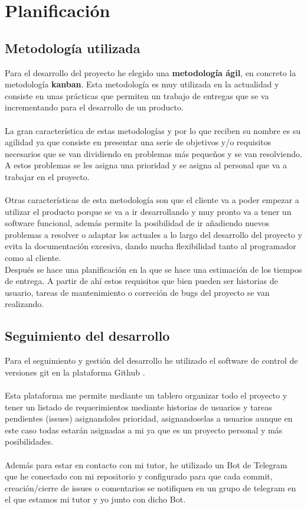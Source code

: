 \chapter{Planificación}

\section{Metodología utilizada}
Para el desarrollo del proyecto he elegido una \textbf{metodología ágil}, en concreto la metodología \textbf{kanban}.
Esta metodología es muy utilizada en la actualidad y consiste en unas prácticas que permiten un trabajo de entregas que se va incrementando para el desarrollo de un producto. \\\\
La gran característica de estas metodologías y por lo que reciben su nombre es su agilidad ya que consiste en presentar una serie de objetivos y/o requisitos necesarios que se van dividiendo en problemas más pequeños 
y se van resolviendo. A estos problemas se les asigna una prioridad y se asigna al personal que va a trabajar en el proyecto.\\\\
Otras características de esta metodología son que el cliente va a poder empezar a utilizar el producto porque se va a ir desarrollando y muy pronto va a tener un software funcional, 
además permite la posibilidad de ir añadiendo nuevos problemas a resolver o adaptar los actuales a lo largo del desarrollo del proyecto y evita la documentación excesiva, dando mucha flexibilidad tanto al programador como al cliente.\\

Después se hace una planificación en la que se hace una estimación de los tiempos de entrega.
A partir de ahí estos requisitos que bien pueden ser historias de usuario, tareas de mantenimiento o correción de bugs del proyecto se van realizando.
 
\newpage
\section{Seguimiento del desarrollo}

Para el seguimiento y gestión del desarrollo he utilizado el software de control de versiones
git \cite{git} en la plataforma Github \cite{Github}.\\\\
Esta plataforma me permite mediante un tablero organizar todo el proyecto
y tener un listado de requerimientos mediante historias de usuarios y tareas pendientes (issues) asignandoles
prioridad, asignandoselas a usuarios aunque en este caso todas estarán asignadas a mi ya que es un proyecto personal 
y más posibilidades.\\\\
Además para estar en contacto con mi tutor, he utilizado un Bot de Telegram que he conectado con mi repositorio y 
configurado para que cada commit, creación/cierre de issues o comentarios se notifiquen en un grupo de telegram en el que estamos mi tutor y yo
junto con dicho Bot.\\

